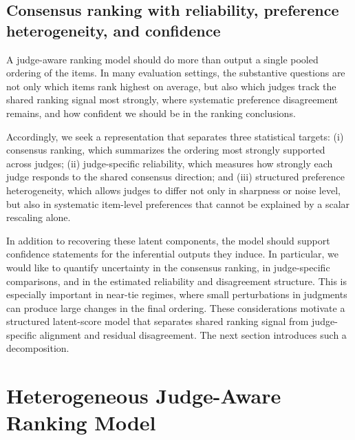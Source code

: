 \documentclass{article}
\begin{document}
\begin{bibunit}[unsrtnat]
\subsection{Consensus ranking with reliability, preference heterogeneity, and confidence}

A judge-aware ranking model should do more than output a single pooled ordering of the items. 
In many evaluation settings, the substantive questions are not only which items rank highest on average, but also which judges track the shared ranking signal most strongly, where systematic preference disagreement remains, and how confident we should be in the ranking conclusions.

Accordingly, we seek a representation that separates three statistical targets: 
(i) consensus ranking, which summarizes the ordering most strongly supported across judges;
(ii) judge-specific reliability, which measures how strongly each judge responds to the shared consensus direction;
and (iii) structured preference heterogeneity, which allows judges to differ not only in sharpness or noise level, but also in systematic item-level preferences that cannot be explained by a scalar rescaling alone.

In addition to recovering these latent components, the model should support confidence statements for the inferential outputs they induce. In particular, we would like to quantify uncertainty in the consensus ranking, in judge-specific comparisons, and in the estimated reliability and disagreement structure. This is especially important in near-tie regimes, where small perturbations in judgments can produce large changes in the final ordering. These considerations motivate a structured latent-score model that separates shared ranking signal from judge-specific alignment and residual disagreement. 
The next section introduces such a decomposition.



\section{Heterogeneous Judge-Aware Ranking Model}


\end{bibunit}
\end{document}
